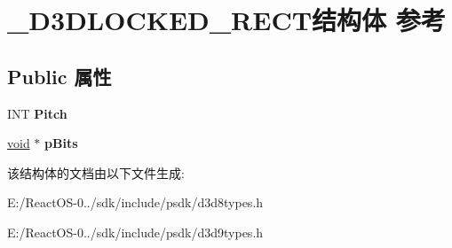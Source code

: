 \hypertarget{struct___d3_d_l_o_c_k_e_d___r_e_c_t}{}\section{\+\_\+\+D3\+D\+L\+O\+C\+K\+E\+D\+\_\+\+R\+E\+C\+T结构体 参考}
\label{struct___d3_d_l_o_c_k_e_d___r_e_c_t}
\subsection*{Public 属性}
\begin{DoxyCompactItemize}
\item 
\mbox{\label{struct___d3_d_l_o_c_k_e_d___r_e_c_t_a260b49bca9775fdd533ce765c9e91f7d}} 
I\+NT {\bfseries Pitch}
\item 
\mbox{\label{struct___d3_d_l_o_c_k_e_d___r_e_c_t_a1e65f8623193378819fdc588fa99efa4}} 
\hyperlink{interfacevoid}{void} $\ast$ {\bfseries p\+Bits}
\end{DoxyCompactItemize}


该结构体的文档由以下文件生成\+:\begin{DoxyCompactItemize}
\item 
E\+:/\+React\+O\+S-\/0../sdk/include/psdk/d3d8types.\+h\item 
E\+:/\+React\+O\+S-\/0../sdk/include/psdk/d3d9types.\+h\end{DoxyCompactItemize}

